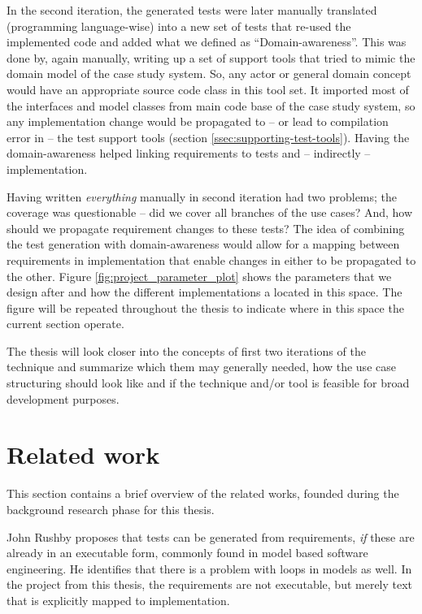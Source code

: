 \noindent In the second iteration, the generated tests were later manually translated (programming language-wise) into a new set of tests that re-used the implemented code and added what we defined as ``Domain-awareness''. This was done by, again manually, writing up a set of support tools that tried to mimic the domain model of the case study system. So, any actor or general domain concept would have an appropriate source code class in this tool set. It imported most of the interfaces and model classes from main code base of the case study system, so any implementation change would be propagated to -- or lead to compilation error in -- the test support tools (section \ref{ssec:supporting-test-tools}). Having the domain-awareness helped linking requirements to tests and -- indirectly -- implementation.\medskip

\noindent Having written \emph{everything} manually in second iteration had two problems; the coverage was questionable -- did we cover all branches of the use cases? And, how should we propagate requirement changes to these tests? The idea of combining the test generation with domain-awareness would allow for a mapping between requirements in implementation that enable changes in either to be propagated to the other. Figure \ref{fig:project_parameter_plot} shows the parameters that we design after and how the different implementations a located in this space. The figure will be repeated throughout the thesis to indicate where in this space the current section operate.\medskip

\noindent The thesis will look closer into the concepts of first two iterations of the technique and summarize which them may generally needed, how the use case structuring should look like and if the technique and/or tool is feasible for broad development purposes.\medskip

\section{Related work}
This section contains a brief overview of the related works, founded during the background research phase for this thesis.\medskip

\noindent John Rushby\cite{rushby2008automated} proposes that tests can be generated from requirements, \emph{if} these are already in an executable form, commonly found in model based software engineering. He identifies that there is a problem with loops in models as well. In the project from this thesis, the requirements are not executable, but merely text that is explicitly mapped to implementation.\medskip

